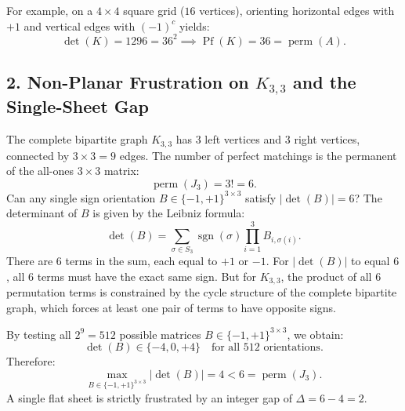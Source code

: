 \documentclass[11pt,a4paper]{article}
\theoremstyle{definition}
\begin{document}
For example, on a $4 \times 4$ square grid ($16$ vertices), orienting horizontal edges with $+1$ and vertical edges with $(-1)^c$ yields:
\begin{equation}
\det(K) = 1296 = 36^2 \implies \operatorname{Pf}(K) = 36 = \operatorname{perm}(A).
\end{equation}

\subsection{2. Non-Planar Frustration on $K_{3,3}$ and the Single-Sheet Gap}
The complete bipartite graph $K_{3,3}$ has $3$ left vertices and $3$ right vertices, connected by $3 \times 3 = 9$ edges. The number of perfect matchings is the permanent of the all-ones $3 \times 3$ matrix:
\begin{equation}
\operatorname{perm}(J_3) = 3! = 6.
\end{equation}
Can any single sign orientation $B \in \{-1, +1\}^{3 \times 3}$ satisfy $|\det(B)| = 6$?
The determinant of $B$ is given by the Leibniz formula:
\begin{equation}
\det(B) = \sum_{\sigma \in S_3} \operatorname{sgn}(\sigma) \prod_{i=1}^3 B_{i, \sigma(i)}.
\end{equation}
There are $6$ terms in the sum, each equal to $+1$ or $-1$. For $|\det(B)|$ to equal $6$, all $6$ terms must have the exact same sign. But for $K_{3,3}$, the product of all $6$ permutation terms is constrained by the cycle structure of the complete bipartite graph, which forces at least one pair of terms to have opposite signs.

By testing all $2^9 = 512$ possible matrices $B \in \{-1, +1\}^{3 \times 3}$, we obtain:
\begin{equation}
\det(B) \in \{-4, 0, +4\} \quad \text{for all } 512 \text{ orientations}.
\end{equation}
Therefore:
\begin{equation}
\max_{B \in \{-1, +1\}^{3 \times 3}} |\det(B)| = 4 < 6 = \operatorname{perm}(J_3).
\end{equation}
A single flat sheet is strictly frustrated by an integer gap of $\Delta = 6 - 4 = 2$.
\end{document}

